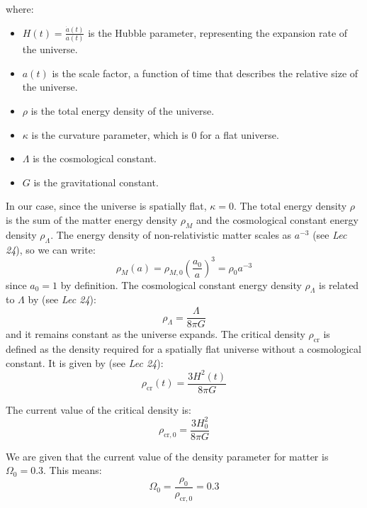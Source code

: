 \documentclass{article}
\begin{document}
where:
\begin{itemize}
    \item $H(t) = \frac{\dot{a}(t)}{a(t)}$ is the Hubble parameter, representing the expansion rate of the universe.
    \item $a(t)$ is the scale factor, a function of time that describes the relative size of the universe.
    \item $\rho$ is the total energy density of the universe.
    \item $\kappa$ is the curvature parameter, which is 0 for a flat universe.
    \item $\Lambda$ is the cosmological constant.
    \item $G$ is the gravitational constant.
\end{itemize}

In our case, since the universe is spatially flat, $\kappa = 0$. The total energy density $\rho$ is the sum of the matter energy density $\rho_M$ and the cosmological constant energy density $\rho_\Lambda$. The energy density of non-relativistic matter scales as $a^{-3}$ (see \emph{Lec 24}), so we can write:
\begin{equation}
\rho_M(a) = \rho_{M,0} \left( \frac{a_0}{a} \right)^3 = \rho_{0} a^{-3}
\end{equation}
since $a_0 = 1$ by definition.
The cosmological constant energy density $\rho_\Lambda$ is related to $\Lambda$ by (see \emph{Lec 24}):
\begin{equation}
\rho_\Lambda = \frac{\Lambda}{8\pi G}
\end{equation}
and it remains constant as the universe expands.
The critical density $\rho_{\text{cr}}$ is defined as the density required for a spatially flat universe without a cosmological constant. It is given by (see \emph{Lec 24}):
\begin{equation}
\rho_{\text{cr}}(t) = \frac{3H^2(t)}{8\pi G}
\end{equation}

The current value of the critical density is:
\begin{equation}
\rho_{\text{cr},0} = \frac{3H_0^2}{8\pi G}
\end{equation}

We are given that the current value of the density parameter for matter is $\Omega_{0} = 0.3$. This means:
\begin{equation}
\Omega_{0} = \frac{\rho_{0}}{\rho_{\text{cr},0}} = 0.3
\end{equation}
\end{document}
